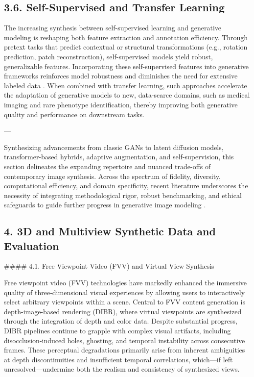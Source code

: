 \documentclass[11pt]{article}
\begin{document}
\subsection{3.6. Self-Supervised and Transfer Learning}

The increasing synthesis between self-supervised learning and generative modeling is reshaping both feature extraction and annotation efficiency. Through pretext tasks that predict contextual or structural transformations (e.g., rotation prediction, patch reconstruction), self-supervised models yield robust, generalizable features. Incorporating these self-supervised features into generative frameworks reinforces model robustness and diminishes the need for extensive labeled data \cite{ref79}. When combined with transfer learning, such approaches accelerate the adaptation of generative models to new, data-scarce domains, such as medical imaging and rare phenotype identification, thereby improving both generative quality and performance on downstream tasks.

---

Synthesizing advancements from classic GANs to latent diffusion models, transformer-based hybrids, adaptive augmentation, and self-supervision, this section delineates the expanding repertoire and nuanced trade-offs of contemporary image synthesis. Across the spectrum of fidelity, diversity, computational efficiency, and domain specificity, recent literature underscores the necessity of integrating methodological rigor, robust benchmarking, and ethical safeguards to guide further progress in generative image modeling \cite{ref1, ref2, ref3, ref5, ref6, ref10, ref12, ref13, ref14, ref15, ref16, ref18, ref21, ref22, ref23, ref24, ref25, ref26, ref29, ref30, ref32, ref54, ref55, ref60, ref61, ref62, ref64, ref65, ref66, ref70, ref73, ref74, ref76, ref79, ref81, ref83, ref85, ref89, ref90, ref91, ref92, ref93, ref94, ref95, ref96, ref97, ref100, ref101, ref102}.


\subsection{4. 3D and Multiview Synthetic Data and Evaluation}

#### 4.1. Free Viewpoint Video (FVV) and Virtual View Synthesis

Free viewpoint video (FVV) technologies have markedly enhanced the immersive quality of three-dimensional visual experiences by allowing users to interactively select arbitrary viewpoints within a scene. Central to FVV content generation is depth-image-based rendering (DIBR), where virtual viewpoints are synthesized through the integration of depth and color data. Despite substantial progress, DIBR pipelines continue to grapple with complex visual artifacts, including disocclusion-induced holes, ghosting, and temporal instability across consecutive frames. These perceptual degradations primarily arise from inherent ambiguities at depth discontinuities and insufficient temporal correlations, which—if left unresolved—undermine both the realism and consistency of synthesized views.
\end{document}
